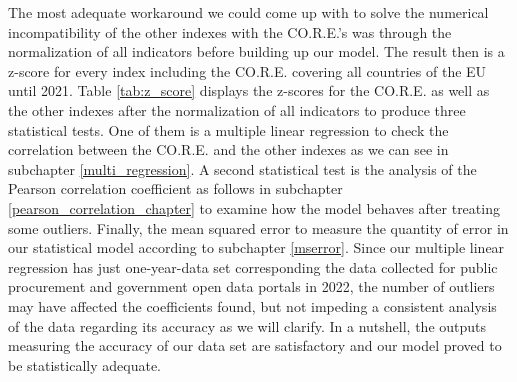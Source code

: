 \documentclass[a4paper, twoside]{report}
\begin{document}
The most adequate workaround we could come up with to solve the numerical incompatibility of the other indexes with the CO.R.E.'s was through the normalization of all indicators before building up our model. The result then is a z-score for every index including the CO.R.E. covering all countries of the EU until 2021. Table \ref{tab:z_score} displays the z-scores for the CO.R.E. as well as the other indexes after the normalization of all indicators to produce three statistical tests. One of them is a multiple linear regression to check the correlation between the CO.R.E. and the other indexes as we can see in subchapter \ref{multi_regression}. A second statistical test is the analysis of the Pearson correlation coefficient as follows in subchapter \ref{pearson_correlation_chapter} to examine how the model behaves after treating some outliers. Finally, the mean squared error to measure the quantity of error in our statistical model according to subchapter \ref{mserror}. Since our multiple linear regression has just one-year-data set corresponding the data collected for public procurement and government open data portals in 2022, the number of outliers may have affected the coefficients found, but not impeding a consistent analysis of the data regarding its accuracy as we will clarify. In a nutshell, the outputs measuring the accuracy of our data set are satisfactory and our model proved to be statistically adequate.\\
\end{document}

